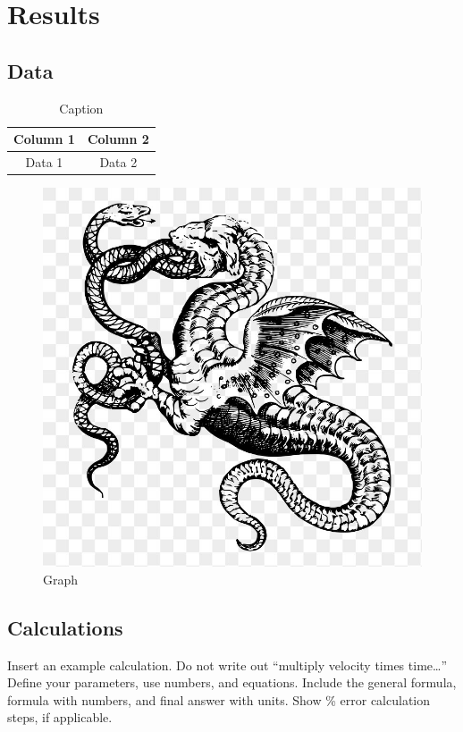 \documentclass[stu,biblatex,floatsintext,draftall]{apa7}
\begin{document}
\section{Results}
\subsection{Data}
\begin{table}
	\centering
	\caption{Caption}
	\label{tab:data}
	\begin{tabular}{cc}
		Column 1 & Column 2 \\
		\hline
		Data 1 & Data 2
	\end{tabular}
\end{table}
\begin{figure}
	\caption{Graph}
	\label{fig:data-graph}
	\includegraphics{dragon}
\end{figure}

\subsection{Calculations}
Insert an example calculation.  Do not write out “multiply velocity times time…”  Define your parameters, use numbers, and equations. Include the general formula, formula with numbers, and final answer with units. Show \% error calculation steps, if applicable.
\end{document}
